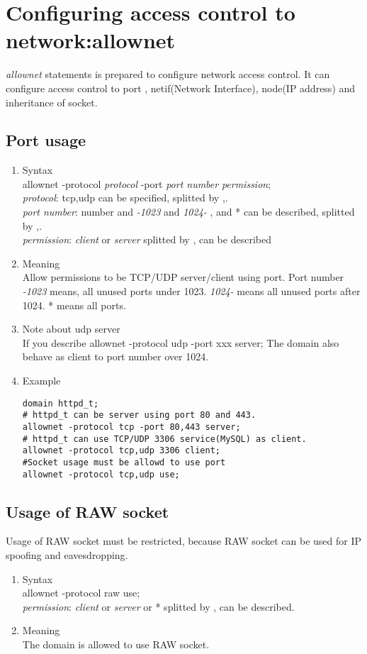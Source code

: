\documentclass{article}
\begin{document}
\begin{enumerate}
\end{enumerate}



\section{Configuring access control to network:allownet}
{\it allownet} statements is prepared to configure network access control.
It can configure access control to  port , netif(Network
Interface), node(IP address) and inheritance of socket.

\subsection{Port usage}
\begin{enumerate}
 \item Syntax\\
 allownet -protocol {\it protocol} -port {\it port number} {\it permission};\\
 {\it protocol}: tcp,udp can be specified, splitted by ,.\\
 {\it port number}: number and {\it -1023} and {\it 1024-} , and * can
       be described, splitted by ,.\\
 {\it permission}: {\it client} or {\it server} splitted by , can be
       described
 \item Meaning\\
       Allow permissions to be TCP/UDP server/client using port. Port number {\it
       -1023} means, all unused ports under 1023. {\it 1024-} means all
       unused ports after 1024. * means all ports. 
 \item Note about udp server\\
       If you describe allownet -protocol udp -port xxx server;
       The domain also behave as client to port number over 1024.
 \item Example
\begin{verbatim}
domain httpd_t;
# httpd_t can be server using port 80 and 443.
allownet -protocol tcp -port 80,443 server;
# httpd_t can use TCP/UDP 3306 service(MySQL) as client.
allownet -protocol tcp,udp 3306 client;
#Socket usage must be allowd to use port
allownet -protocol tcp,udp use;
\end{verbatim}
\end{enumerate}

\subsection{Usage of RAW socket}
Usage of RAW socket must be restricted, because RAW socket can be used
for IP spoofing and eavesdropping.
\begin{enumerate}
 \item Syntax\\
       allownet -protocol raw use;\\
        {\it permission}: {\it client} or {\it server} or * splitted by , can be
       described.
 \item Meaning\\
       The domain is allowed to use RAW socket.
\end{enumerate}
\end{document}
